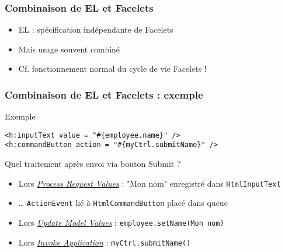 \documentclass[english, french]{beamer}
\begin{document}
\begin{frame}
	\frametitle{Combinaison de EL et Facelets}
	\begin{itemize}
		\item EL : spécification indépendante de Facelets
		\item Mais usage souvent combiné
		\item Cf. fonctionnement normal du cycle de vie Facelets !
	\end{itemize}
\end{frame}

\begin{frame}[fragile]
	\frametitle{Combinaison de EL et Facelets : exemple}
	\begin{exampleblock}{Exemple}
	\begin{lstlisting}[aboveskip=0em, belowskip=0em]
<h:inputText value = "#{employee.name}" />
<h:commandButton action = "#{myCtrl.submitName}" />
	\end{lstlisting}
	\end{exampleblock}
	Quel traitement après envoi via bouton Submit ?
	\pause
	\begin{itemize}
		\item Lors \hyperlink{ph-prv}{\emph{Process Request Values}} : "Mon nom" enregistré dans \texttt{HtmlInputText} \pause
		\item … \texttt{ActionEvent} lié à \texttt{HtmlCommandButton} placé dans queue \pause
		\item Lors \hyperlink{ph-umv}{\emph{Update Model Values}} : \texttt{employee.setName(Mon nom)} \pause
		\item Lors \hyperlink{ph-ia}{\emph{Invoke Application}} : \texttt{myCtrl.submitName()}
	\end{itemize}
\end{frame}
\end{document}
